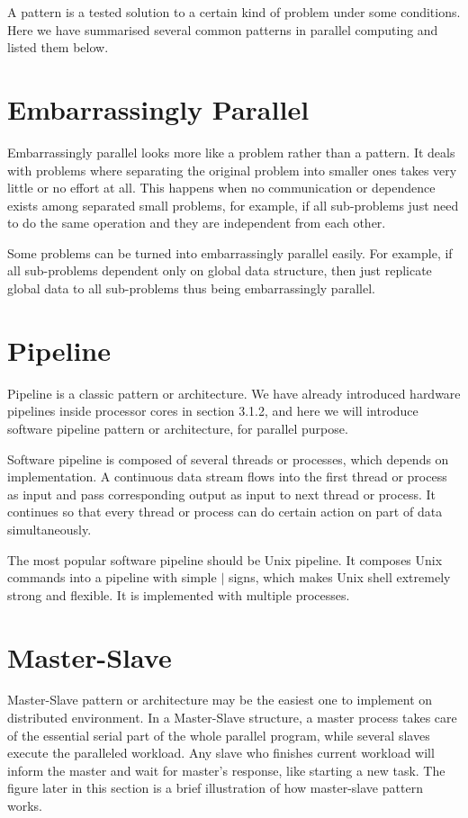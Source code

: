 \documentclass[12pt,a4paper]{report}
\begin{document}
A pattern is a tested solution to a certain kind of problem under some conditions. Here we have summarised several common patterns in parallel computing and listed them below.

\section{Embarrassingly Parallel}

Embarrassingly parallel looks more like a problem rather than a pattern. It deals with problems where separating the original problem into smaller ones takes very little or no effort at all. This happens when no communication or dependence exists among separated small problems, for example, if all sub-problems just need to do the same operation and they are independent from each other.

Some problems can be turned into embarrassingly parallel easily. For example, if all sub-problems dependent only on global data structure, then just replicate global data to all sub-problems thus being embarrassingly parallel.

\section{Pipeline}

Pipeline is a classic pattern or architecture. We have already introduced hardware pipelines inside processor cores in section 3.1.2, and here we will introduce software pipeline pattern or architecture, for parallel purpose.

Software pipeline is composed of several threads or processes, which depends on implementation. A continuous data stream flows into the first thread or process as input and pass corresponding output as input to next thread or process. It continues so that every thread or process can do certain action on part of data simultaneously.

The most popular software pipeline should be Unix pipeline. It composes Unix commands into a pipeline with simple $\mid$ signs, which makes Unix shell extremely strong and flexible. It is implemented with multiple processes.

\section{Master-Slave}

Master-Slave pattern or architecture may be the easiest one to implement on distributed environment. In a Master-Slave structure, a master process takes care of the essential serial part of the whole parallel program, while several slaves execute the paralleled workload. Any slave who finishes current workload will inform the master and wait for master's response, like starting a new task. The figure later in this section is a brief illustration of how master-slave pattern works.
\end{document}
